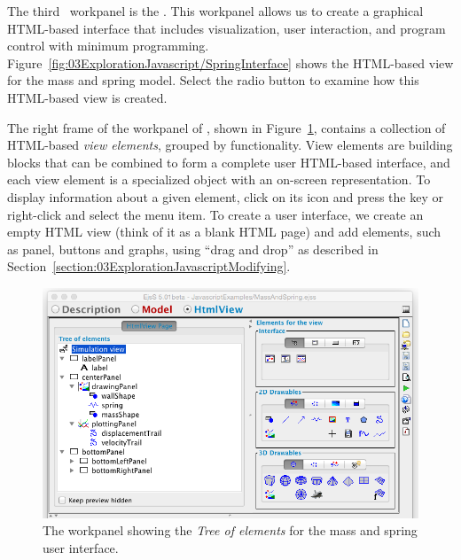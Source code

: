 The third \Ejs\ workpanel is the .  This workpanel allows us to create a graphical HTML-based interface that includes
visualization, user interaction, and program control with minimum programming.
Figure~\ref{fig:03ExplorationJavascript/SpringInterface} shows the HTML-based view for the mass and spring model. Select the  radio
button to examine how this HTML-based view is created.

The right frame of the  workpanel of \ejs, shown in Figure~\ref{fig:03ExplorationJavascript/View}, contains a collection of HTML-based 
\emph{view elements}, grouped by functionality. View elements are building blocks that can be
combined to form a complete user HTML-based interface, and each view element is a specialized object with an on-screen
representation. To display information about a given element, click on its icon and press the  key or right-click and select the  menu item. To create a user interface, we create an empty HTML view (think of it as a blank HTML page) and add elements, such as panel, buttons and graphs, using ``drag and drop'' as described in Section~\ref{section:03ExplorationJavascriptModifying}.

\begin{figure}[htb]
    \centering
  \includegraphics[scale=\scale]{03ExplorationJavascript/images/View.png}
    \caption{The  workpanel showing the \emph{Tree of elements} for the mass and spring user interface.}
    \label{fig:03ExplorationJavascript/View}
\end{figure}

